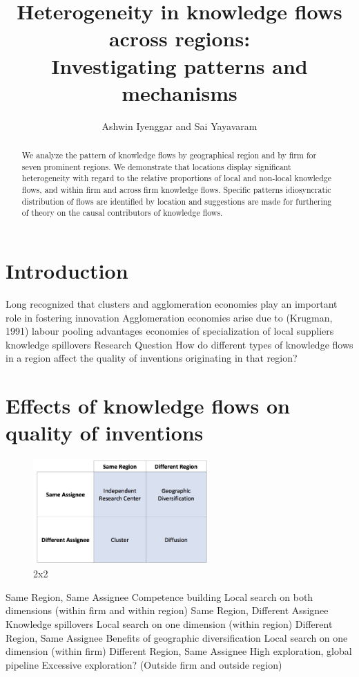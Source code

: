 \documentclass[12pt]{article}
\begin{document}
\title{Heterogeneity in knowledge flows across regions:\\ Investigating patterns and mechanisms}
\author{Ashwin Iyenggar and Sai Yayavaram} 

\maketitle
\thispagestyle{empty}
\begin{abstract}
\noindent We analyze the pattern of knowledge flows by geographical region and by firm for seven prominent regions. We demonstrate that locations display significant heterogeneity with regard to the relative proportions of local and non-local knowledge flows, and within firm and across firm knowledge flows. Specific patterns idiosyncratic distribution of flows are identified by location and suggestions are made for furthering of theory on the causal contributors of knowledge flows.
\end{abstract}

\section{Introduction}
Long recognized that clusters and agglomeration economies play an important role in fostering innovation
Agglomeration economies arise due to (Krugman, 1991)
labour pooling advantages 
economies of specialization of local suppliers
knowledge spillovers
Research Question
How do different types of knowledge flows in a region affect the quality of inventions originating in that region?


\section{Effects of knowledge flows on quality of inventions}
\begin{figure}[h]
\begin{centering}
  \includegraphics[width=0.6\textwidth]{2x2}
  \caption{2x2}
  \label{fig:2x2}
\end{centering}
\end{figure}
Same Region, Same Assignee
Competence building
Local search on both dimensions
(within firm and within region)
Same Region, Different Assignee
Knowledge spillovers
Local search on one dimension (within region)
Different Region, Same Assignee
Benefits of geographic diversification
Local search on one dimension (within firm)
Different Region, Same Assignee
High exploration, global pipeline
Excessive exploration?
(Outside firm and outside region)
\end{document}
